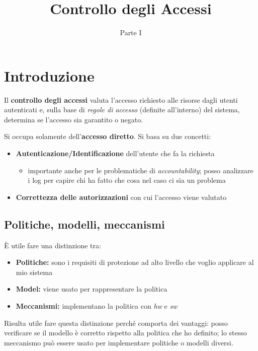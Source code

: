 \documentclass{report}
\title{\huge\textbf{{Controllo degli Accessi}}}
\date{Parte I}
\begin{document}
\maketitle

\tableofcontents
\newpage

\chapter{Introduzione}

\noindent Il \textbf{controllo degli accessi} valuta l'accesso richiesto alle risorse dagli 
utenti autenticati e, sulla base di \textit{regole di accesso} (definite all'interno)
del sistema, determina se l'accesso sia garantito o negato.

\noindent Si occupa solamente dell'\textbf{accesso diretto}. Si basa su due concetti:
\begin{itemize}
    \item \textbf{Autenticazione/Identificazione} dell'utente che fa la richiesta
    \begin{itemize}
        \item importante anche per le problematiche di \textit{accountability}; posso
        analizzare i log per capire chi ha fatto che cosa nel caso ci sia un problema
    \end{itemize}
    \item \textbf{Correttezza delle autorizzazioni} con cui l'accesso viene valutato
\end{itemize}

\section{Politiche, modelli, meccanismi}
È utile fare una distinzione tra:
\begin{itemize}
    \item \textbf{Politiche:} sono i requisiti di protezione ad alto livello che voglio applicare 
    al mio sistema 
    \item \textbf{Model:} viene usato per rappresentare la politica 
    \item \textbf{Meccanismi:} implementano la politica con \textit{hw} e \textit{sw}
\end{itemize}

\noindent Risulta utile fare questa distinzione perché comporta dei vantaggi: posso 
verificare se il modello è corretto rispetto alla politica che ho definito; lo 
stesso meccanismo può essere usato per implementare politiche o modelli diversi.
\end{document}
